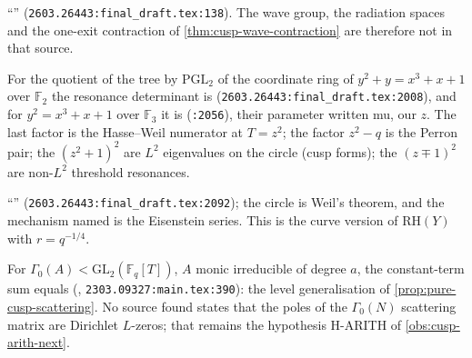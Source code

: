 \begin{citedfact}
\label{cit:apw-lax-phillips-open}
``\texttt{}''
(\texttt{2603.26443:final\_draft.tex:138}). The wave group, the radiation spaces and the one-exit
contraction of \cref{thm:cusp-wave-contraction} are therefore not in that source.
\end{citedfact}

\begin{citedfact}
\label{cit:apw-elliptic-curves}
For the quotient of the tree by $\mathrm{PGL}_2$ of the coordinate ring of $y^2+y = x^3+x+1$ over
$\mathbb F_2$ the resonance determinant is
\texttt{} (\texttt{2603.26443:final\_draft.tex:2008}),
and for $y^2 = x^3+x+1$ over $\mathbb F_3$ it is
\texttt{} (\texttt{:2056}), their parameter written mu, our $z$.
The last factor is the Hasse--Weil numerator at $T = z^2$; the factor $z^2-q$ is the Perron pair; the
$(z^2+1)^2$ are $L^2$ eigenvalues on the circle (cusp forms); the $(z\mp1)^2$ are non-$L^2$
threshold resonances.
\end{citedfact}

\begin{citedfact}
\label{cit:apw-weil-circle}
``\texttt{}''
(\texttt{2603.26443:final\_draft.tex:2092}); the circle is Weil's theorem, and the mechanism named is the
Eisenstein series. This is the curve version of $\mathrm{RH}(Y)$ with $r = q^{-1/4}$.
\end{citedfact}

\begin{citedfact}
\label{cit:kk-level-constant-term}
For $\Gamma_0(A)<\mathrm{GL}_2(\mathbb F_q[T])$, $A$ monic irreducible of degree $a$, the constant-term sum
equals \texttt{}
(\cite{kaneko2023que}, \texttt{2303.09327:main.tex:390}): the level generalisation of
\cref{prop:pure-cusp-scattering}. No source found states that the poles of the $\Gamma_0(N)$ scattering
matrix are Dirichlet $L$-zeros; that remains the hypothesis H-ARITH of \cref{obs:cusp-arith-next}.
\end{citedfact}

